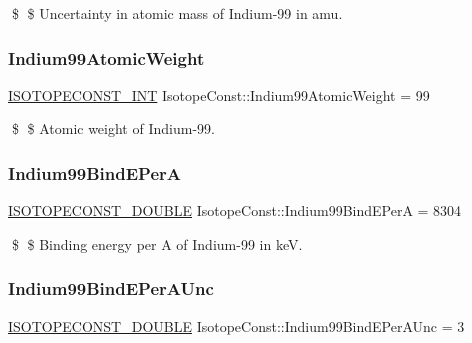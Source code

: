 \$ \$ Uncertainty in atomic mass of Indium-\/99 in amu. \mbox{\label{group___isotope_const-_indium-_in99_gafe646802b13471cf8b4d5feceb3e3b1d}} 
\subsubsection{\texorpdfstring{Indium99\+Atomic\+Weight}{Indium99AtomicWeight}}
{\footnotesize\ttfamily \mbox{\hyperlink{group___isotope_const-_macros_ga5f18360b3e99483a35c32d789e62621c}{I\+S\+O\+T\+O\+P\+E\+C\+O\+N\+S\+T\+\_\+\+I\+NT}} Isotope\+Const\+::\+Indium99\+Atomic\+Weight = 99}

\$ \$ Atomic weight of Indium-\/99. \mbox{\label{group___isotope_const-_indium-_in99_gaf74ea3cb30014b8f0608415ead7e9e39}} 
\subsubsection{\texorpdfstring{Indium99\+Bind\+E\+PerA}{Indium99BindEPerA}}
{\footnotesize\ttfamily \mbox{\hyperlink{group___isotope_const-_macros_ga8f45a7272ce02c0b4c65c44636ed719a}{I\+S\+O\+T\+O\+P\+E\+C\+O\+N\+S\+T\+\_\+\+D\+O\+U\+B\+LE}} Isotope\+Const\+::\+Indium99\+Bind\+E\+PerA = 8304}

\$ \$ Binding energy per A of Indium-\/99 in keV. \mbox{\label{group___isotope_const-_indium-_in99_gab51185996d8a800af7fa7d7b3b089243}} 
\subsubsection{\texorpdfstring{Indium99\+Bind\+E\+Per\+A\+Unc}{Indium99BindEPerAUnc}}
{\footnotesize\ttfamily \mbox{\hyperlink{group___isotope_const-_macros_ga8f45a7272ce02c0b4c65c44636ed719a}{I\+S\+O\+T\+O\+P\+E\+C\+O\+N\+S\+T\+\_\+\+D\+O\+U\+B\+LE}} Isotope\+Const\+::\+Indium99\+Bind\+E\+Per\+A\+Unc = 3}

